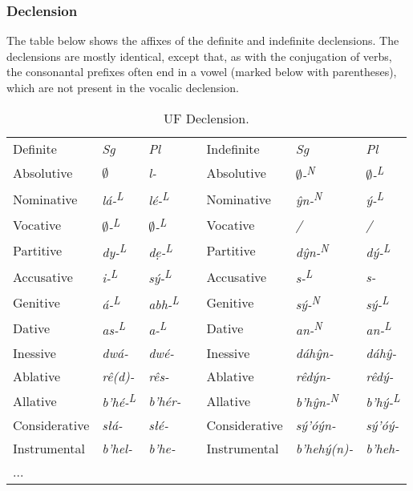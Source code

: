 \documentclass[a4paper, 12pt, oneside, final]{article}
\let \nf \normalfont
\def \L {\textsuperscript{L}}
\def \N {\textsuperscript{N}}
\begin{document}
\subsubsection{Declension}
The table below shows the affixes of the definite and indefinite declensions. The declensions are mostly identical,
except that, as with the conjugation of verbs, the consonantal prefixes often end in a vowel (marked below with
parentheses), which are not present in the vocalic declension.

\begin{table}[H]
\centering
\noindent\begin{tabular}{@{}|l|>{\it}l|>{\it}l|l|l|>{\it}l|>{\it}l|}\cline{1-3}\cline{5-7}
Definite    &\nf Sg&\nf Pl && Indefinite       &\nf Sg&\nf Pl\\\cline{1-3}\cline{5-7}

Absolutive    & $\emptyset$     & l-      &&Absolutive    & $\emptyset$-\N & $\emptyset$-\L   \\\cline{1-3}\cline{5-7}
Nominative    & lá-\L   & lé-\L   &&Nominative    & ŷn-\N & ý-\L      \\\cline{1-3}\cline{5-7}
Vocative      & $\emptyset$-\L  & $\emptyset$-\L  &&Vocative      & / & /             \\\cline{1-3}\cline{5-7}
Partitive     & dy-\L   & dẹ-\L   &&Partitive     & dŷn-\N & dý-\L    \\\cline{1-3}\cline{5-7}
Accusative    & i-\L    & sý-\L   &&Accusative    & s-\L & s-         \\\cline{1-3}\cline{5-7}
Genitive      & á-\L    & abh-\L  &&Genitive      & sý-\N & sý-\L     \\\cline{1-3}\cline{5-7}
Dative        & as-\L   & a-\L    &&Dative        & an-\N & an-\L     \\\cline{1-3}\cline{5-7}
Inessive      & dwá-    & dwé-    &&Inessive      & dáhŷn- & dáhŷ-    \\\cline{1-3}\cline{5-7}
Ablative      & rê(d)-  & rês-    &&Ablative      & rêdýn- & rêdý-    \\\cline{1-3}\cline{5-7}
Allative      & b’hé-\L & b’hér-  &&Allative      & b’hŷn-\N & b’hý-\L  \\\cline{1-3}\cline{5-7}
Considerative & słá-    & słé-    &&Considerative & sý’óýn- & sý’óý-  \\\cline{1-3}\cline{5-7}
Instrumental  & b’hel-  & b’he-   &&Instrumental  & b’hehý(n)- & b’heh-  \\\cline{1-3}\cline{5-7}
...           &         &         &&              & &                 \\\cline{1-3}\cline{5-7}
\end{tabular}
\caption{UF Declension.}\label{tab:table-uf-declension}
\end{table}
\end{document}
